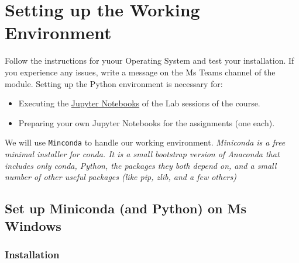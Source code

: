 \documentclass[
  letterpaper,
  DIV=11,
  numbers=noendperiod]{scrreprt}
\providecommand{\tightlist}{%
  \setlength{\itemsep}{0pt}\setlength{\parskip}{0pt}}\usepackage{longtable,booktabs,array}
\begin{document}

\hypertarget{setting-up-the-working-environment}{%
\chapter*{Setting up the Working
Environment}\label{setting-up-the-working-environment}}


Follow the instructions for yuour Operating System and test your
installation. If you experience any issues, write a message on the Ms
Teams channel of the module. Setting up the Python environment is
necessary for:

\begin{itemize}
\tightlist
\item
  Executing the \href{https://docs.jupyter.org/en/latest/}{Jupyter
  Notebooks} of the Lab sessions of the course.
\item
  Preparing your own Jupyter Notebooks for the assignments (one each).
\end{itemize}

We will use \texttt{Minconda} to handle our working environment.
\emph{Miniconda is a free minimal installer for conda. It is a small
bootstrap version of Anaconda that includes only conda, Python, the
packages they both depend on, and a small number of other useful
packages (like pip, zlib, and a few others)}

\hypertarget{set-up-miniconda-and-python-on-ms-windows}{%
\section*{Set up Miniconda (and Python) on Ms
Windows}\label{set-up-miniconda-and-python-on-ms-windows}}


\hypertarget{installation}{%
\subsection*{Installation}\label{installation}}
\end{document}
